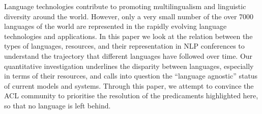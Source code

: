 Language technologies contribute to promoting multilingualism and linguistic diversity around the world. However, only a very small number of the over 7000 languages of the world are represented in the rapidly evolving language technologies and applications. In this paper we look at the relation between the types of languages, resources, and their representation in NLP conferences to understand the trajectory that different languages have followed over time. Our quantitative investigation underlines the disparity between languages, especially in terms of their resources, and calls into question the ``language agnostic'' status of current models and systems. Through this paper, we attempt to convince the ACL community to prioritise the resolution of the predicaments highlighted here, so that no language is left behind.

